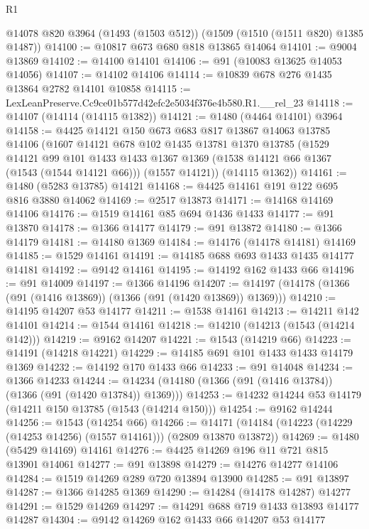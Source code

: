 \begin{lexlean}{R1}
\begin{coremodule}
    @14078
    @820
    @3964
    (@1493 (@1503 @512))
    (@1509 (@1510 (@1511 @820) @1385 @1487))
@14100 := @10817 @673 @680 @818 @13865 @14064
@14101 := @9004 @13869
@14102 := @14100 @14101
@14106 := @91 (@10083 @13625 @14053 @14056)
@14107 := @14102 @14106
@14114 := @10839 @678 @276 @1435 @13864 @2782 @14101 @10858
@14115 := LexLeanPreserve.Cc9ce01b577d42efc2e5034f376e4b580.R1.__rel_23
@14118 := @14107 (@14114 (@14115 @1382))
@14121 := @1480 (@4464 @14101) @3964
@14158 := @4425
    @14121
    @150
    @673
    @683
    @817
    @13867
    @14063
    @13785
    @14106
    (@1607
      @14121
      @678
      @102
      @1435
      @13781
      @1370
      @13785
      (@1529
        @14121
        @99
        @101
        @1433
        @1433
        @1367
        @1369
        (@1538 @14121 @66 @1367 (@1543 (@1544 @14121 @66)))
        (@1557 @14121))
      (@14115 @1362))
@14161 := @1480 (@5283 @13785) @14121
@14168 := @4425 @14161 @191 @122 @695 @816 @3880 @14062
@14169 := @2517 @13873
@14171 := @14168 @14169 @14106
@14176 := @1519 @14161 @85 @694 @1436 @1433
@14177 := @91 @13870
@14178 := @1366 @14177
@14179 := @91 @13872
@14180 := @1366 @14179
@14181 := @14180 @1369
@14184 := @14176 (@14178 @14181) @14169
@14185 := @1529 @14161
@14191 := @14185 @688 @693 @1433 @1435 @14177 @14181
@14192 := @9142 @14161
@14195 := @14192 @162 @1433 @66
@14196 := @91 @14009
@14197 := @1366 @14196
@14207 := @14197 (@14178 (@1366 (@91 (@1416 @13869)) (@1366 (@91 (@1420 @13869)) @1369)))
@14210 := @14195 @14207 @53 @14177
@14211 := @1538 @14161
@14213 := @14211 @142 @14101
@14214 := @1544 @14161
@14218 := @14210 (@14213 (@1543 (@14214 @142)))
@14219 := @9162 @14207
@14221 := @1543 (@14219 @66)
@14223 := @14191 (@14218 @14221)
@14229 := @14185 @691 @101 @1433 @1433 @14179 @1369
@14232 := @14192 @170 @1433 @66
@14233 := @91 @14048
@14234 := @1366 @14233
@14244 := @14234 (@14180 (@1366 (@91 (@1416 @13784)) (@1366 (@91 (@1420 @13784)) @1369)))
@14253 := @14232 @14244 @53 @14179 (@14211 @150 @13785 (@1543 (@14214 @150)))
@14254 := @9162 @14244
@14256 := @1543 (@14254 @66)
@14266 := @14171 (@14184 (@14223 (@14229 (@14253 @14256) (@1557 @14161))) (@2809 @13870 @13872))
@14269 := @1480 (@5429 @14169) @14161
@14276 := @4425 @14269 @196 @11 @721 @815 @13901 @14061
@14277 := @91 @13898
@14279 := @14276 @14277 @14106
@14284 := @1519 @14269 @289 @720 @13894 @13900
@14285 := @91 @13897
@14287 := @1366 @14285 @1369
@14290 := @14284 (@14178 @14287) @14277
@14291 := @1529 @14269
@14297 := @14291 @688 @719 @1433 @13893 @14177 @14287
@14304 := @9142 @14269 @162 @1433 @66 @14207 @53 @14177

\end{coremodule}
\end{lexlean}
